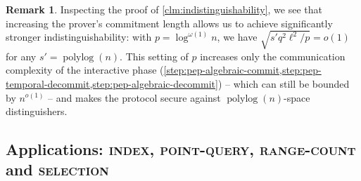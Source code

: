\documentclass[a4paper,UKenglish,cleveref, autoref, thm-restate]{lipics-v2021}
\theoremstyle{definition}
\newtheorem{remark}[theorem]{Remark}
\newcommand{\polylog}{\operatorname{polylog}}
\newcommand{\indexproblem}{\normalfont\textsc{index}\xspace}
\newcommand{\pointquery}{\normalfont\textsc{point-query}\xspace}
\newcommand{\rangecount}{\normalfont\textsc{range-count}\xspace}
\newcommand{\selection}{\normalfont\textsc{selection}\xspace}
\newcommand{\pcommitlength}{p}
\newcommand{\fieldsize}{q}
\begin{document}
\begin{remark}
    \label{rem:indistinguishability-pep}
    Inspecting the proof of \cref{clm:indistinguishability}, we see that increasing the prover's commitment length allows us to achieve significantly stronger indistinguishability: with $\pcommitlength = \log^{\omega(1)} n$, we have $\sqrt{s' \fieldsize^2 \ell^2/\pcommitlength} = o(1)$ for any $s' = \polylog(n)$. This setting of $\pcommitlength$ increases only the communication complexity of the interactive phase (\cref{step:pep-algebraic-commit,step:pep-temporal-decommit,step:pep-algebraic-decommit}) -- which can still be bounded by $n^{o(1)}$ -- and makes the protocol secure against $\polylog(n)$-space distinguishers.
\end{remark}

\subsection{Applications: \indexproblem, \pointquery, \rangecount and \selection}
\label{sec:pep-applications}
\end{document}
